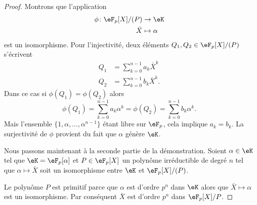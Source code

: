 \begin{proof}
    Montrons que l'application
    \begin{equation}
        \begin{aligned}
            \phi\colon \eF_p[X]/(P)&\to \eK \\
            \bar X&\mapsto \alpha
        \end{aligned}
    \end{equation}
    est un isomorphisme. Pour l'injectivité, deux éléments \( Q_1,Q_2\in \eF_p[X]/(P)\) s'écrivent
    \begin{subequations}
        \begin{align}
            Q_1&=\sum_{k=0}^{n-1}a_k\bar X^k\\
            Q_2&=\sum_{k=0}^{n-1}b_k\bar X^k.
        \end{align}
    \end{subequations}
    Dans ce cas si \( \phi(Q_1)=\phi(Q_2)\) alors
    \begin{equation}
        \phi(Q_1)=\sum_{k=0}^{n-1}a_k\alpha^k=\phi(Q_2)=\sum_{k=0}^{n-1}b_k\alpha^k.
    \end{equation}
    Mais l'ensemble \( \{ 1,\alpha,\ldots, \alpha^{n-1} \}\) étant libre sur \( \eF_p\), cela implique \( a_k=b_k\). La surjectivité de \( \phi\) provient du fait que \( \alpha\) génère \( \eK\).

    Nous passons maintenant à la seconde partie de la démonstration. Soient \( \alpha\in \eK\) tel que \( \eK=\eF_p[\alpha]\) et \( P\in \eF_p[X]\) un polynôme irréductible de degré \( n\) tel que \( \alpha\mapsto \bar X\) soit un isomorphisme entre \( \eK\) et \( \eF_p[X]/(P)\).

    Le polynôme \( P\) est primitif parce que \( \alpha\) est d'ordre \( p^n\) dans \( \eK\) alors que \( \bar X\mapsto \alpha\) est un isomorphisme. Par conséquent \( \bar X\) est d'ordre \( p^n\) dans \( \eF_p[X]/P\).


\end{proof}
